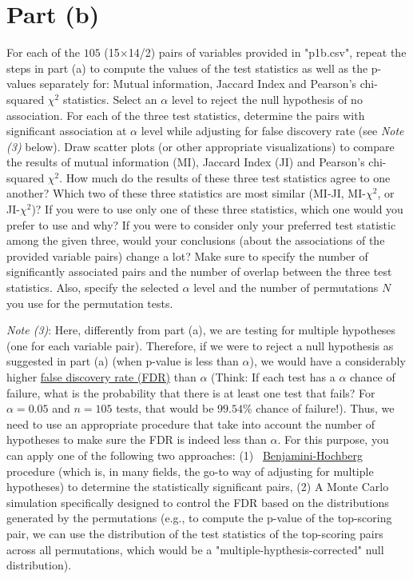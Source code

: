 \section{Part (b)}
For each of the $105$ (15$\times$14/2) pairs of variables provided in "p1b.csv", repeat the steps in part (a) to compute the values of the test statistics as well as the p-values separately for: Mutual information, Jaccard Index and Pearson's chi-squared $\chi^2$ statistics. Select an $\alpha$ level to reject the null hypothesis of no association. For each of the three test statistics, determine the pairs with significant association at $\alpha$ level while adjusting for false discovery rate (see \textit{Note (3)} below). Draw scatter plots (or other appropriate visualizations) to compare the results of mutual information (MI), Jaccard Index (JI) and Pearson's chi-squared $\chi^2$. How much do the results of these three test statistics agree to one another? Which two of these three statistics are most similar (MI-JI, MI-$\chi^2$, or JI-$\chi^2$)? If you were to use only one of these three statistics, which one would you prefer to use and why? If you were to consider only your preferred test statistic among the given three, would your conclusions (about the associations of the provided variable pairs) change a lot? Make sure to specify the number of significantly associated pairs and the number of overlap between the three test statistics. Also, specify the selected $\alpha$ level and the number of permutations $N$ you use for the permutation tests.

\vspace{0.2cm}
\noindent
\textit{Note (3)}: Here, differently from part (a), we are testing for multiple hypotheses (one for each variable pair). Therefore, if we were to reject a null hypothesis as suggested in part (a) (when p-value is less than $\alpha$), we would have a considerably higher \href{https://en.wikipedia.org/wiki/False_discovery_rate}{false discovery rate (FDR)} than $\alpha$ (Think: If each test has a $\alpha$ chance of failure, what is the probability that there is at least one test that fails? For $\alpha = 0.05$ and $n=105$ tests, that would be $99.54\%$ chance of failure!). Thus, we need to use an appropriate procedure that take into account the number of hypotheses to make sure the FDR is indeed less than $\alpha$. For this purpose, you can apply one of the following two approaches: (1)~ \href{https://en.wikipedia.org/wiki/False_discovery_rate#Benjamini\%E2\%80\%93Hochberg_procedure}{Benjamini-Hochberg} procedure (which is, in many fields, the go-to way of adjusting for multiple hypotheses) to determine the statistically significant pairs, (2) A Monte Carlo simulation  specifically designed to control the FDR based on the distributions generated by the permutations (e.g., to compute the p-value of the top-scoring pair, we can use the distribution of the test statistics of the top-scoring pairs across all permutations, which would be a "multiple-hypthesis-corrected" null distribution).

